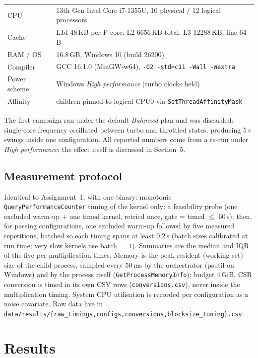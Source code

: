 \documentclass[11pt,a4paper]{article}
\begin{document}
\begin{center}
\small
\begin{tabular}{@{}ll@{}}
\toprule
CPU & 13th Gen Intel Core i7-1355U, 10 physical / 12 logical processors \\
Cache & L1d 48\,KB per P-core, L2 6656\,KB total, L3 12288\,KB, line 64\,B \\
RAM / OS & 16.8\,GB, Windows 10 (build 26200) \\
Compiler & GCC 16.1.0 (MinGW-w64), \texttt{-O2 -std=c11 -Wall -Wextra} \\
Power scheme & Windows \emph{High performance} (turbo clocks held) \\
Affinity & children pinned to logical CPU0 via \texttt{SetThreadAffinityMask} \\
\bottomrule
\end{tabular}
\end{center}

The first campaign ran under the default \emph{Balanced} plan and was discarded:
single-core frequency oscillated between turbo and throttled states, producing
5$\times$ swings inside one configuration. All reported numbers come from a
re-run under \emph{High performance}; the effect itself is discussed in
Section~5.

\subsection{Measurement protocol}

Identical to Assignment~1, with one binary: monotonic \texttt{QueryPerformanceCounter}
timing of the kernel only; a feasibility probe (one excluded warm-up + one timed
kernel, retried once, gate = timed $\le$ 60\,s); then, for passing configurations,
one excluded warm-up followed by five measured repetitions, batched so each
timing spans at least 0.2\,s (batch sizes calibrated at run time; very slow
kernels use batch $=1$). Summaries are the median and IQR of the five
per-multiplication times. Memory is the peak resident (working-set) size of the
child process, sampled every 50\,ms by the orchestrator (psutil on Windows) and by
the process itself (\texttt{GetProcessMemoryInfo}); budget 4\,GiB. CSR conversion
is timed in its own CSV rows (\texttt{conversions.csv}), never inside the
multiplication timing. System CPU utilisation is recorded per configuration as a
noise covariate. Raw data live in
\texttt{data/results/\{raw\_timings,configs,conversions,blocksize\_tuning\}.csv}.

\section{Results}
\end{document}
